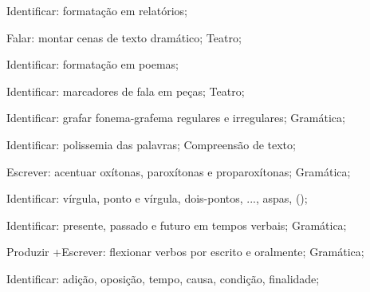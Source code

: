  Identificar: formatação em relatórios;

 Falar: montar cenas de texto dramático; Teatro; 

 Identificar: formatação em poemas; 

 Identificar: marcadores de fala em peças; Teatro;

 Identificar: grafar fonema-grafema regulares e irregulares; Gramática;

 Identificar: polissemia das palavras; Compreensão de texto;

 Escrever: acentuar oxítonas, paroxítonas e proparoxítonas; Gramática;

 Identificar: vírgula, ponto e vírgula, dois-pontos, ..., aspas, ();

 Identificar: presente, passado e futuro em tempos verbais; Gramática;

 Produzir +Escrever: flexionar verbos por escrito e oralmente; Gramática;

 Identificar: adição, oposição, tempo, causa, condição, finalidade;

